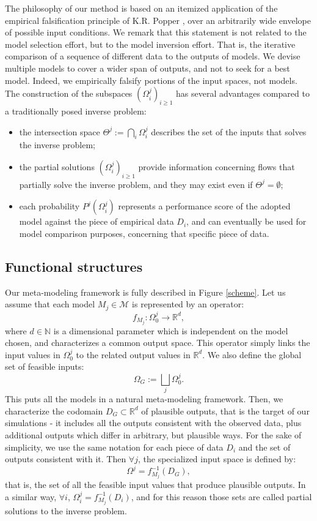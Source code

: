 \documentclass[nhess, manuscript]{copernicus}
\begin{document}
The philosophy of our method is based on an itemized application of the empirical falsification principle of K.R. Popper \citep{Popper1959}, over an arbitrarily wide envelope of possible input conditions. We remark that this statement is not related to the model selection effort, but to the model inversion effort. That is, the iterative comparison of a sequence of different data to the outputs of models. We devise multiple models to cover a wider span of outputs, and not to seek for a best model. Indeed, we empirically falsify portions of the input spaces, not models. The construction of the subspaces $(\Omega^j_i)_{i\ge1}$ has several advantages compared to a traditionally posed inverse problem:
\begin{itemize}
  \item the intersection space $\Theta^j:=\bigcap_i \Omega^j_i$ describes the set of the inputs that solves the inverse problem;
  \item the partial solutions $(\Omega^j_i)_{i\ge1}$ provide information concerning flows that partially solve the inverse problem, and they may exist even if $\Theta^j=\emptyset$;
  \item each probability $P^j(\Omega^j_i)$ represents a performance score of the adopted model against the piece of empirical data $D_i$, and can eventually be used for model comparison purposes, concerning  that specific piece of data.
\end{itemize}

\subsection{Functional structures}
Our meta-modeling framework is fully described in Figure \ref{scheme}. Let us assume that each model $M_j\in\mathcal M$ is represented by an operator:
$$f_{M_j}: \Omega^j_0 \longrightarrow \mathbb R^d,$$
where $d\in\mathbb N$ is a dimensional parameter which is independent on the model chosen, and characterizes a common output space. This operator simply links the input values in $ \Omega^j_0$ to the related output values in $\mathbb R^d$. We also define the global set of feasible inputs:
$$\Omega_G:=\bigsqcup_j \Omega^j_0.$$
This puts all the models in a natural meta-modeling framework. Then, we characterize the codomain $D_G\subset \mathbb R^d$ of plausible outputs, that is the target of our simulations - it includes all the outputs consistent with the observed data, plus additional outputs which differ in arbitrary, but plausible ways. For the sake of simplicity, we use the same notation for each piece of data $D_i$ and the set of outputs consistent with it. Then $\forall j$, the specialized input space is defined by:
$$\Omega^j=f_{M_j}^{-1}\left(D_G\right),$$
that is, the set of all the feasible input values that produce plausible outputs.
In a similar way, $\forall i$, $\Omega^j_i=f_{M_j}^{-1}\left(D_i\right)$, and for this reason those sets are called partial solutions to the inverse problem.
\end{document}
